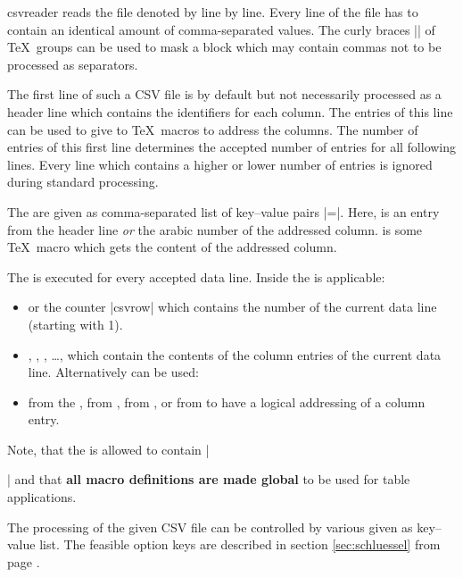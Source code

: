 \documentclass[a4paper,11pt]{ltxdoc}
\begin{document}
\begin{docCommand}{csvreader}{}
   reads the file denoted by  line by line.
  Every line of the file has to contain an identical amount of
  comma-separated values. The curly braces |{}| of \TeX\ groups can be used
  to mask a block which may contain commas not to be processed as separators.\smallskip

  The first line of such a CSV file is by default but not necessarily
  processed as a header line which contains the identifiers for each column.
  The entries of this line can be used to give  to \TeX\ macros
  to address the columns. The number of entries of this first line
  determines the accepted number of entries for all following lines.
  Every line which contains a higher or lower number of entries is ignored
  during standard processing.\smallskip

  The  are given as comma-separated list of key–value pairs
  \mbox{|=|}. Here,  is an entry from the
  header line \emph{or} the arabic number of the addressed column.
   is some \TeX\ macro which gets the content of the addressed column.\smallskip

  The  is executed for every accepted data line. Inside the
   is applicable:
  \begin{itemize}
  \item {} or the counter |csvrow| which contains the number of the
    current data line (starting with 1).
  \item {}, , , \ldots,
    which contain the contents of the column entries of the current data line.
    Alternatively can be used:
  \item {} from the ,
    from ,
    from ,
    or from 
    to have a logical
    addressing of a column entry.
  \end{itemize}
  Note, that the  is allowed to contain |\par| and
  that \textbf{all macro definitions are made global} to be used for table applications.\smallskip

  The processing of the given CSV file can be controlled by various
   given as key–value list. The feasible option keys
  are described in section \ref{sec:schluessel} from page \pageref{sec:schluessel}.


\end{docCommand}
\end{document}
